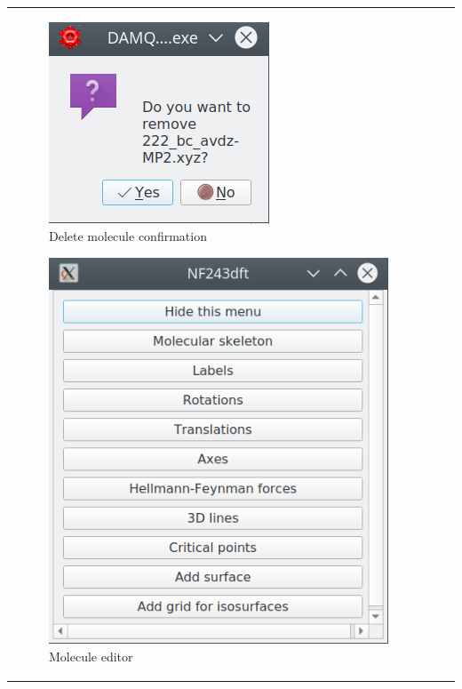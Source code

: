 \documentclass[10pt]{article}
\begin{document}
\begin{tabular}{lcr}
\begin{minipage}{.5\linewidth}
\begin{figure}[H]
    \begin{center}
        \includegraphics[width=0.4\linewidth]{damqt320_molecule_delete.png}
    \end{center}
    \caption{Delete molecule confirmation \label{fig:4_13_1}}
\end{figure}

\begin{figure}[H]
    \begin{center}
        \includegraphics[width=0.6\linewidth]{damqt320_molecule_edit.png}
    \end{center}
    \caption{{Molecule editor}\label{fig:4_13_2}}
\end{figure}
\end{minipage}
\end{tabular}

\vspace*{5mm}
\end{document}
